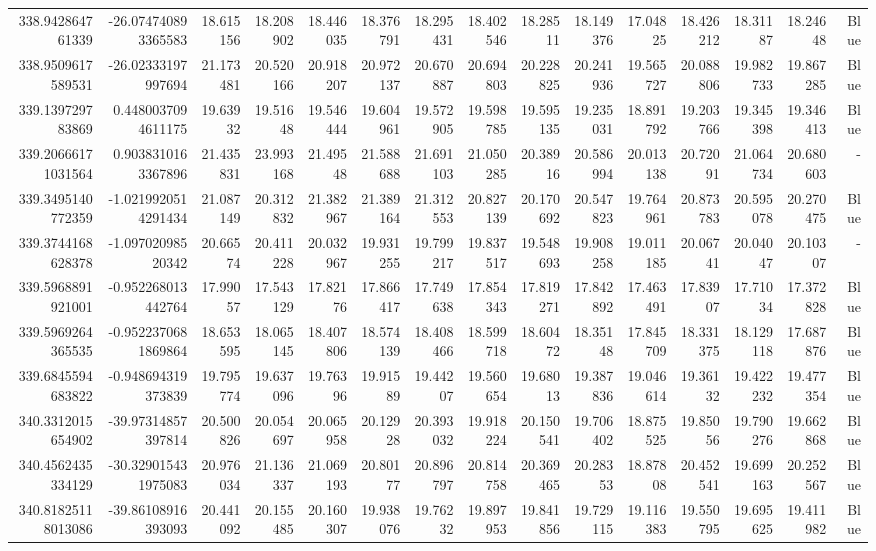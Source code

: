 \begin{center}
\begin{longtable}{rrrrrrrrrrrrrrr}
338.942864761339 & -26.074740893365583 & 18.615156 & 18.208902 & 18.446035 & 18.376791 & 18.295431 & 18.402546 & 18.28511 & 18.149376 & 17.04825 & 18.426212 & 18.31187 & 18.24648 & Blue \\
338.9509617589531 & -26.02333197997694 & 21.173481 & 20.520166 & 20.918207 & 20.972137 & 20.670887 & 20.694803 & 20.228825 & 20.241936 & 19.565727 & 20.088806 & 19.982733 & 19.867285 & Blue \\
339.139729783869 & 0.4480037094611175 & 19.63932 & 19.51648 & 19.546444 & 19.604961 & 19.572905 & 19.598785 & 19.595135 & 19.235031 & 18.891792 & 19.203766 & 19.345398 & 19.346413 & Blue \\
339.20666171031564 & 0.9038310163367896 & 21.435831 & 23.993168 & 21.49548 & 21.588688 & 21.691103 & 21.050285 & 20.38916 & 20.586994 & 20.013138 & 20.72091 & 21.064734 & 20.680603 & - \\
339.3495140772359 & -1.0219920514291434 & 21.087149 & 20.312832 & 21.382967 & 21.389164 & 21.312553 & 20.827139 & 20.170692 & 20.547823 & 19.764961 & 20.873783 & 20.595078 & 20.270475 & Blue \\
339.3744168628378 & -1.09702098520342 & 20.66574 & 20.411228 & 20.032967 & 19.931255 & 19.799217 & 19.837517 & 19.548693 & 19.908258 & 19.011185 & 20.06741 & 20.04047 & 20.10307 & - \\
339.5968891921001 & -0.952268013442764 & 17.99057 & 17.543129 & 17.82176 & 17.866417 & 17.749638 & 17.854343 & 17.819271 & 17.842892 & 17.463491 & 17.83907 & 17.71034 & 17.372828 & Blue \\
339.5969264365535 & -0.9522370681869864 & 18.653595 & 18.065145 & 18.407806 & 18.574139 & 18.408466 & 18.599718 & 18.60472 & 18.35148 & 17.845709 & 18.331375 & 18.129118 & 17.687876 & Blue \\
339.6845594683822 & -0.948694319373839 & 19.795774 & 19.637096 & 19.76396 & 19.91589 & 19.44207 & 19.560654 & 19.68013 & 19.387836 & 19.046614 & 19.36132 & 19.422232 & 19.477354 & Blue \\
340.3312015654902 & -39.97314857397814 & 20.500826 & 20.054697 & 20.065958 & 20.12928 & 20.393032 & 19.918224 & 20.150541 & 19.706402 & 18.875525 & 19.85056 & 19.790276 & 19.662868 & Blue \\
340.4562435334129 & -30.329015431975083 & 20.976034 & 21.136337 & 21.069193 & 20.80177 & 20.896797 & 20.814758 & 20.369465 & 20.28353 & 18.87808 & 20.452541 & 19.699163 & 20.252567 & Blue \\
340.81825118013086 & -39.86108916393093 & 20.441092 & 20.155485 & 20.160307 & 19.938076 & 19.76232 & 19.897953 & 19.841856 & 19.729115 & 19.116383 & 19.550795 & 19.695625 & 19.411982 & Blue \\

\end{longtable}
\end{center}
